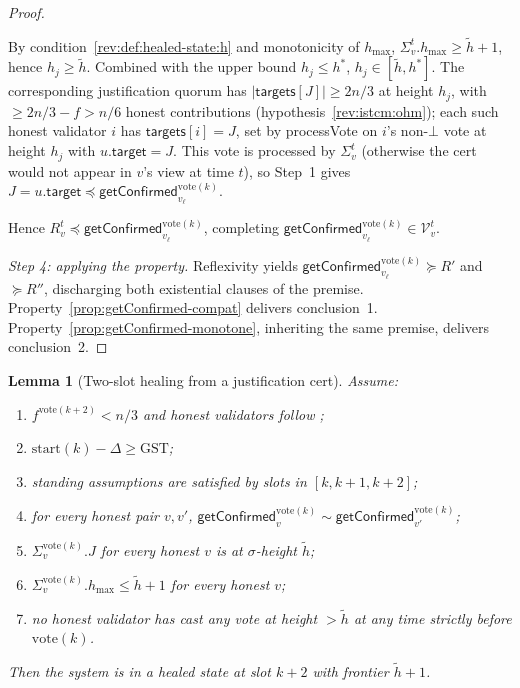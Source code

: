 \documentclass{article}
\newcommand{\V}[0]{\ensuremath{\mathcal{V}}}
\newcommand{\target}{\mathsf{target}}
\newcommand{\targets}{\mathsf{targets}}
\newcommand{\hmax}{\ensuremath{h_{\max}}\xspace}
\newcommand{\processVote}{\textsf{processVote}\xspace}
\newcommand{\start}{\ensuremath{\mathrm{start}}}
\newcommand{\vote}{\ensuremath{\mathrm{vote}}}
\newcommand{\GST}{\ensuremath{\mathrm{GST}}\xspace}
\newcommand{\comm}[1]{\ensuremath{\widetilde{#1}}}
\newcommand{\getConfirmed}{\textsf{getConfirmed}\xspace}
\theoremstyle{plain}
\newtheorem{lemma}{Lemma}
\theoremstyle{definition}
\theoremstyle{remark}
\begin{document}
\begin{proof}
\begin{itemize}
  By condition~\ref{rev:def:healed-state:h} and monotonicity of $\hmax$, $\Sigma_v^t.\hmax \geq \comm{h}+1$, hence $h_j \geq \comm{h}$.
  Combined with the upper bound $h_j \leq h^\ast$, $h_j \in [\comm{h}, h^\ast]$.
  The corresponding justification quorum has $|\targets[J]| \geq 2n/3$ at height $h_j$, with $\geq 2n/3 - f > n/6$ honest contributions (hypothesis~\ref{rev:istcm:ohm}); each such honest validator $i$ has $\targets[i] = J$, set by \processVote on $i$'s non-$\bot$ vote at height $h_j$ with $u.\target = J$.
  This vote is processed by $\Sigma_v^t$ (otherwise the cert would not appear in $v$'s view at time $t$), so Step~1 gives $J = u.\target \preceq \getConfirmed_{v_\ell}^{\vote(k)}$.
\end{itemize}
Hence $R_v^t \preceq \getConfirmed_{v_\ell}^{\vote(k)}$, completing $\getConfirmed_{v_\ell}^{\vote(k)} \in \V_v^t$.

\emph{Step 4: applying the property.}
Reflexivity yields $\getConfirmed_{v_\ell}^{\vote(k)} \succeq R'$ and $\succeq R''$, discharging both existential clauses of the premise.
Property~\ref{prop:getConfirmed-compat} delivers conclusion~1.
Property~\ref{prop:getConfirmed-monotone}, inheriting the same premise, delivers conclusion~2.
\end{proof}
\fi


\begin{lemma}[Two-slot healing from a justification cert]\label{lem:healing-from-cert}
Assume:
\begin{enumerate}
  \item\label{rev:hfcert:f} $f^{\vote(k+2)} < n/3$ and honest validators follow ;
  \item\label{rev:hfcert:sync} $\start(k) - \Delta \geq \GST$;
  \item\label{rev:hfcert:standing} standing assumptions are satisfied by slots in $[k,k+1,k+2]$;
  \item\label{rev:hfcert:compat} for every honest pair $v, v'$, $\getConfirmed_v^{\vote(k)} \sim \getConfirmed_{v'}^{\vote(k)}$;
  \item\label{rev:hfcert:hj} $\Sigma_v^{\vote(k)}.J$ for every honest $v$ is at $\sigma$-height $\comm{h}$;
  \item\label{rev:hfcert:hmax} $\Sigma_v^{\vote(k)}.\hmax \leq \comm{h}+1$ for every honest $v$;
  \item\label{rev:hfcert:nh} no honest validator has cast any vote at height $> \comm{h}$ at any time strictly before $\vote(k)$.
\end{enumerate}
Then the system is in a healed state at slot $k+2$ with frontier $\comm{h}+1$.
\end{lemma}
\end{document}
